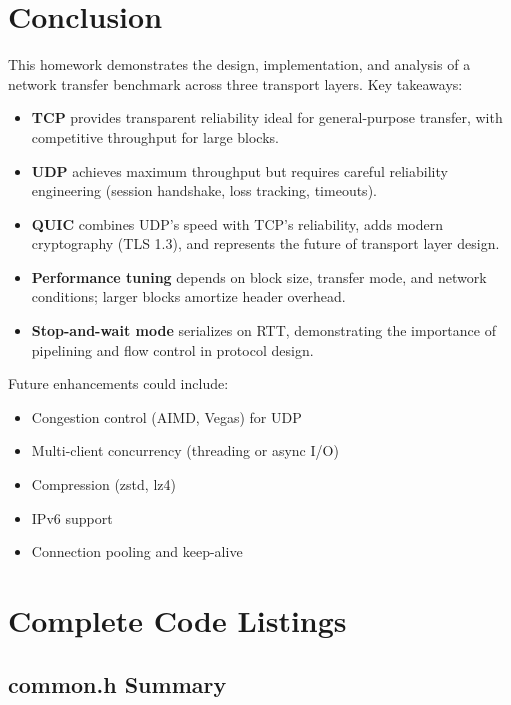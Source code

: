 \documentclass[12pt,a4paper]{article}
\begin{document}
\section{Conclusion}
\label{sec:conclusion}

This homework demonstrates the design, implementation, and analysis of a network transfer benchmark across three transport layers. Key takeaways:

\begin{itemize}
  \item \textbf{TCP} provides transparent reliability ideal for general-purpose transfer, with competitive throughput for large blocks.
  \item \textbf{UDP} achieves maximum throughput but requires careful reliability engineering (session handshake, loss tracking, timeouts).
  \item \textbf{QUIC} combines UDP's speed with TCP's reliability, adds modern cryptography (TLS 1.3), and represents the future of transport layer design.
  \item \textbf{Performance tuning} depends on block size, transfer mode, and network conditions; larger blocks amortize header overhead.
  \item \textbf{Stop-and-wait mode} serializes on RTT, demonstrating the importance of pipelining and flow control in protocol design.
\end{itemize}

Future enhancements could include:
\begin{itemize}
  \item Congestion control (AIMD, Vegas) for UDP
  \item Multi-client concurrency (threading or async I/O)
  \item Compression (zstd, lz4)
  \item IPv6 support
  \item Connection pooling and keep-alive
\end{itemize}

\appendix

\section{Complete Code Listings}
\label{app:code}

\subsection{common.h Summary}
\end{document}
